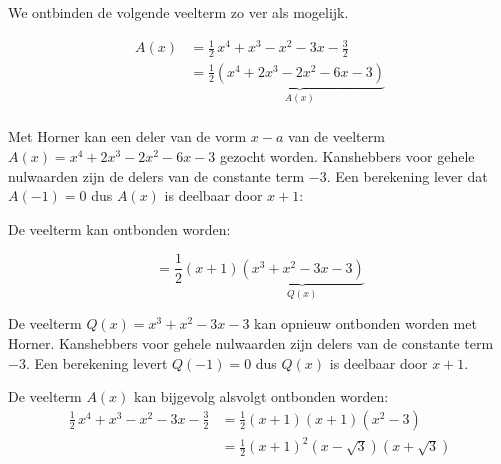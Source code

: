 \documentclass{ximera}
\begin{document}
\begin{example} 
We ontbinden de volgende veelterm zo ver als mogelijk.
\renewcommand{\kolbreed}{\widthof{$-6$}}



$$
\begin{array}{rl}
	 A(x) &= \frac{1}{2}\,x^4 + x^3 - x^2 - 3x - \frac{3}{2} \\
	      &= \frac{1}{2}\underbrace{\left(x^4 + 2x^3 - 2x^2 - 6x - 3 \right)}_{A(x)} \\
\end{array}
$$

Met Horner kan een deler van de vorm \(x-a\) van de veelterm \(A(x) = x^4 + 2x^3 - 2x^2 - 6x - 3 \) gezocht worden. Kanshebbers voor gehele nulwaarden zijn de delers van de constante term $-3$. Een berekening lever dat \(  A(-1) = 0\) dus $A(x)$ is deelbaar door  $x+1$: 


De veelterm kan ontbonden worden: 

\[
= \frac{1}{2}(x+1)\underbrace{(x^3+x^2-3x-3)}_{Q(x)} 
\]

De veelterm \( Q(x) = x^3+x^2-3x-3 \) kan opnieuw ontbonden worden met Horner. Kanshebbers voor gehele nulwaarden zijn delers van de constante term $-3$. 
Een berekening levert \(Q(-1) = 0\) dus $Q(x)$ is deelbaar door $x+1$.


De veelterm \(A(x)\) kan bijgevolg alsvolgt ontbonden worden: 
$$
\begin{array}{rl}
	\frac{1}{2}\,x^4 + x^3 - x^2 - 3x - \frac{3}{2} & = \frac{1}{2}(x+1)(x+1)(x^2-3) \\
													& = \frac{1}{2}(x+1)^2(x-\sqrt{3})(x+\sqrt{3})
\end{array}
$$
\end{example} 
\end{document}
